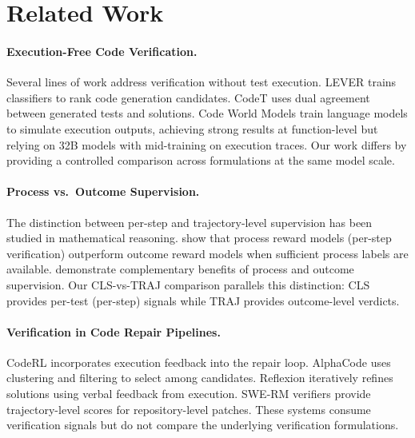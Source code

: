 \documentclass[11pt]{article}
\begin{document}
\section{Related Work}
\label{sec:related}

\paragraph{Execution-Free Code Verification.}
Several lines of work address verification without test execution. LEVER \citep{ni2023lever} trains classifiers to rank code generation candidates. CodeT \citep{chen2022codet} uses dual agreement between generated tests and solutions. Code World Models \citep{gu2024cwm} train language models to simulate execution outputs, achieving strong results at function-level but relying on 32B models with mid-training on execution traces. Our work differs by providing a controlled comparison across formulations at the same model scale.

\paragraph{Process vs.\ Outcome Supervision.}
The distinction between per-step and trajectory-level supervision has been studied in mathematical reasoning. \citet{lightman2023lets} show that process reward models (per-step verification) outperform outcome reward models when sufficient process labels are available. \citet{uesato2022solving} demonstrate complementary benefits of process and outcome supervision. Our CLS-vs-TRAJ comparison parallels this distinction: CLS provides per-test (per-step) signals while TRAJ provides outcome-level verdicts.

\paragraph{Verification in Code Repair Pipelines.}
CodeRL \citep{le2022coderl} incorporates execution feedback into the repair loop. AlphaCode \citep{li2022alphacode} uses clustering and filtering to select among candidates. Reflexion \citep{shinn2023reflexion} iteratively refines solutions using verbal feedback from execution. SWE-RM verifiers \citep{zhang2025swerm} provide trajectory-level scores for repository-level patches. These systems consume verification signals but do not compare the underlying verification formulations.
\end{document}
